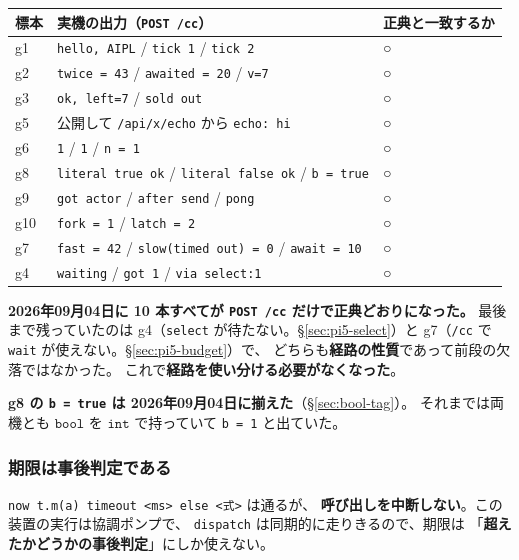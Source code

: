 \documentclass[11pt,a4paper]{ltjsarticle}
\newcommand{\ty}[1]{\ensuremath{\mathtt{#1}}}
\begin{document}
\begin{center}
\small
\begin{tabular}{@{}lll@{}}
\toprule
標本 & 実機の出力（\texttt{POST /cc}） & 正典と一致するか \\
\midrule
g1 & \texttt{hello, AIPL} / \texttt{tick 1} / \texttt{tick 2} & ○ \\
g2 & \texttt{twice = 43} / \texttt{awaited = 20} / \texttt{v=7} & ○ \\
g3 & \texttt{ok, left=7} / \texttt{sold out} & ○ \\
g5 & 公開して \texttt{/api/x/echo} から \texttt{echo: hi} & ○ \\
g6 & \texttt{1} / \texttt{1} / \texttt{n = 1} & ○ \\
g8 & \texttt{literal true ok} / \texttt{literal false ok} / \texttt{b = true} & ○ \\
g9 & \texttt{got actor} / \texttt{after send} / \texttt{pong} & ○ \\
g10 & \texttt{fork  = 1} / \texttt{latch = 2} & ○ \\
g7 & \texttt{fast = 42} / \texttt{slow(timed out) = 0} / \texttt{await = 10} & ○ \\
g4 & \texttt{waiting} / \texttt{got 1} / \texttt{via select:1} & ○ \\
\bottomrule
\end{tabular}
\end{center}

\textbf{2026年09月04日に 10 本すべてが \texttt{POST /cc} だけで正典どおりになった。}
最後まで残っていたのは g4（\texttt{select} が待たない。\S\ref{sec:pi5-select}）と
g7（\texttt{/cc} で \texttt{wait} が使えない。\S\ref{sec:pi5-budget}）で、
どちらも\textbf{経路の性質}であって前段の欠落ではなかった。
これで\textbf{経路を使い分ける必要がなくなった}。

\textbf{g8 の \texttt{b = true} は 2026年09月04日に揃えた}（\S\ref{sec:bool-tag}）。
それまでは両機とも \ty{bool} を \ty{int} で持っていて \texttt{b = 1} と出ていた。

\subsubsection*{期限は事後判定である}
\label{sec:pi5-deadline}

\texttt{now t.m(a) timeout <ms> else <式>} は通るが、
\textbf{呼び出しを中断しない}。この装置の実行は協調ポンプで、
\texttt{dispatch} は同期的に走りきるので、期限は
「\textbf{超えたかどうかの事後判定}」にしか使えない。
\end{document}
